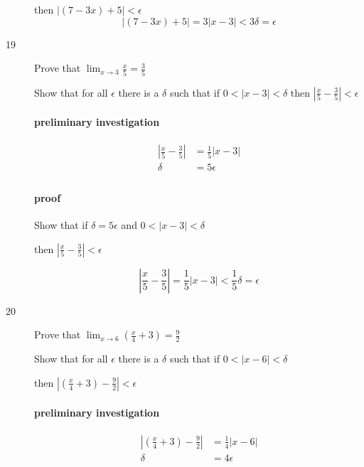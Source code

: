 \documentclass[letterpaper, landscape]{exam}
\begin{document}
\begin{description}
        then $|(7 - 3x) + 5| < \epsilon$
        \[
          |(7 - 3x) + 5| = 3 |x - 3| < 3 \delta = \epsilon
        \]

      \newpage

      \item[19] Prove that $\lim_{x \to 3} \frac{x}{5} = \frac{3}{5}$

        Show that for all $\epsilon$ there is a $\delta$ such that if 
        $0 < |x - 3| < \delta$ then $ \left| \frac{x}{5} - \frac{3}{5} \right| < \epsilon$

        \paragraph{preliminary investigation}
        \begin{align*}
          \left| \frac{x}{5} - \frac{3}{5} \right| & = \frac{1}{5} |x - 3| \\
          \delta                                   & = 5 \epsilon \\
        \end{align*}

        \paragraph{proof}
        Show that if $\delta = 5 \epsilon$ and $0 < |x - 3| < \delta$

        then $\left| \frac{x}{5} - \frac{3}{5} \right| < \epsilon$

        \[
          \left| \frac{x}{5} - \frac{3}{5} \right| = \frac{1}{5} |x - 3| < \frac{1}{5} \delta = \epsilon
        \]

      \item[20] Prove that $\lim_{x \to 6} \left( \frac{x}{4} + 3 \right) = \frac{9}{2}$

        Show that for all $\epsilon$ there is a $\delta$ such that if 
        $0 < |x - 6| < \delta$ 
        
        then $ \left| \left( \frac{x}{4} + 3 \right) - \frac{9}{2} \right| < \epsilon$

        \paragraph{preliminary investigation}

        \begin{align*}
          \left| \left( \frac{x}{4} + 3 \right) - \frac{9}{2} \right| & = \frac{1}{4} |x - 6| \\
          \delta                                               & = 4 \epsilon \\
        \end{align*}


\end{description}
\end{document}
